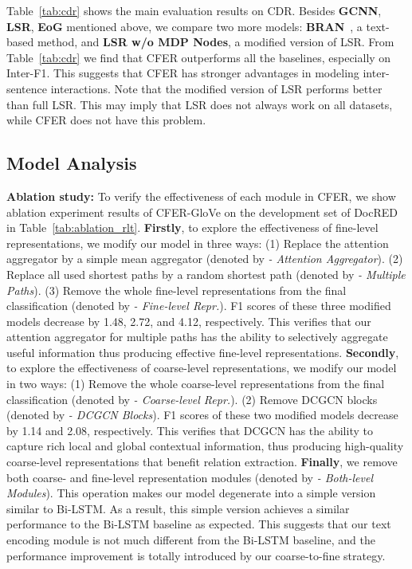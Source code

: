 \documentclass{article}
\newcommand{\citep}{\cite}
\begin{document}
Table~\ref{tab:cdr} shows the main evaluation results on CDR. 
Besides \textbf{GCNN}, \textbf{LSR}, \textbf{EoG} mentioned above, we compare two more models: \textbf{BRAN}~\citep{barn}, a text-based method, and \textbf{LSR w/o MDP Nodes}, a modified version of LSR. 
From Table~\ref{tab:cdr} we find that CFER outperforms all the baselines, especially on Inter-F1. 
This suggests that CFER has stronger advantages in modeling inter-sentence interactions. 
Note that the modified version of LSR performs better than full LSR. 
This may imply that LSR does not always work on all datasets, while CFER does not have this problem. 

\subsection{Model Analysis}

\noindent\textbf{Ablation study: }
To verify the effectiveness of each module in CFER, we show ablation experiment results of CFER-GloVe on the development set of DocRED in Table~\ref{tab:ablation_rlt}. 
\textbf{Firstly}, to explore the effectiveness of fine-level representations, we modify our model in three ways: 
(1) Replace the attention aggregator by a simple mean aggregator (denoted by \textit{- Attention Aggregator}). 
(2) Replace all used shortest paths by a random shortest path (denoted by \textit{- Multiple Paths}). 
(3) Remove the whole fine-level representations from the final classification (denoted by \textit{- Fine-level Repr.}). 
F1 scores of these three modified models decrease by 1.48, 2.72, and 4.12, respectively. 
This verifies that our attention aggregator for multiple paths has the ability to selectively aggregate useful information thus producing effective fine-level representations. 
\textbf{Secondly}, to explore the effectiveness of coarse-level representations, we modify our model in two ways: 
(1) Remove the whole coarse-level representations from the final classification (denoted by \textit{-  Coarse-level Repr.}). 
(2) Remove DCGCN blocks (denoted by \textit{- DCGCN Blocks}). 
F1 scores of these two modified models decrease by 1.14 and 2.08, respectively. 
This verifies that DCGCN has the ability to capture rich local and global contextual information, thus producing high-quality coarse-level representations that benefit relation extraction. 
\textbf{Finally}, we remove both coarse- and fine-level representation modules (denoted by \textit{-  Both-level Modules}). 
This operation makes our model degenerate into a simple version similar to Bi-LSTM. 
As a result, this simple version achieves a similar performance to the Bi-LSTM baseline as expected. 
This suggests that our text encoding module is not much different from the Bi-LSTM baseline, and the performance improvement is totally introduced by our coarse-to-fine strategy. 
\end{document}
